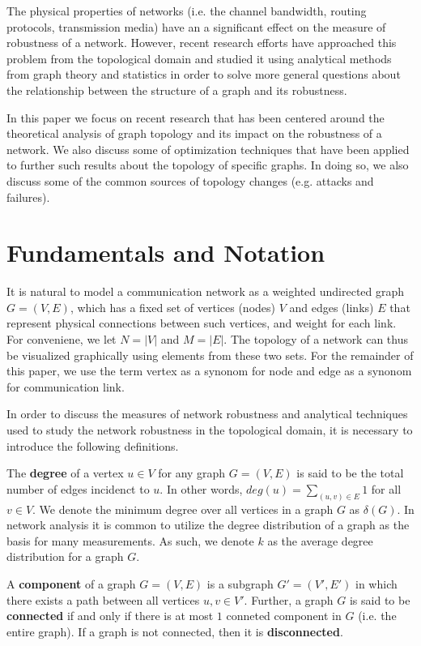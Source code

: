 \documentclass[11pt]{article}
\begin{document}
The physical properties of networks (i.e. the channel bandwidth, routing protocols, transmission media) have an a significant effect on the measure of robustness of a network. However, recent research efforts have approached this problem from the topological domain and studied it using analytical methods from graph theory and statistics in order to solve more general questions about the relationship between the structure of a graph and its robustness. 

In this paper we focus on recent research that has been centered around the theoretical analysis of graph topology and its impact on the robustness of a network. We also discuss some of optimization techniques that have been applied to further such results about the topology of specific graphs. In doing so, we also discuss some of the common sources of topology changes (e.g. attacks and failures). 

\section{Fundamentals and Notation}

It is natural to model a communication network as a weighted undirected graph $G = (V,E)$, which has a fixed set of vertices (nodes) $V$ and edges (links) $E$ that represent physical connections between such vertices, and weight for each link. For conveniene, we let $N = |V|$ and $M = |E|$. The topology of a network can thus be visualized graphically using elements from these two sets. For the remainder of this paper, we use the term vertex as a synonom for node and edge as a synonom for communication link. 

In order to discuss the measures of network robustness and analytical techniques used to study the network robustness in the topological domain, it is necessary to introduce the following definitions.

\begin{define}
The \textbf{degree} of a vertex $u \in V$ for any graph $G = (V,E)$ is said to be the total number of edges incidenct to $u$. In other words, $deg(u) = \sum_{(u,v) \in E} 1$ for all $v \in V$. We denote the minimum degree over all vertices in a graph $G$ as $\delta(G)$. In network analysis it is common to utilize the degree distribution of a graph as the basis for many measurements. As such, we denote $k$ as the average degree distribution for a graph $G$.
\end{define}

\begin{define}
A \textbf{component} of a graph $G = (V,E)$ is a subgraph $G' = (V',E')$ in which there exists a path between all vertices $u, v \in V'$. Further, a graph $G$ is said to be \textbf{connected} if and only if there is at most $1$ conneted component in $G$ (i.e. the entire graph). If a graph is not connected, then it is \textbf{disconnected}.
\end{define}
\end{document}
